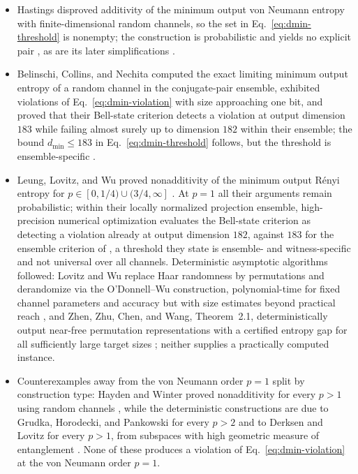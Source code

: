 \begin{itemize}
  \item Hastings disproved additivity of the minimum output von Neumann entropy with
finite-dimensional random channels, so the set in
Eq.~\eqref{eq:dmin-threshold} is nonempty; the construction is probabilistic
and yields no explicit pair , as are its
later simplifications .

  \item Belinschi, Collins, and Nechita computed the exact limiting minimum output
entropy of a random channel in the conjugate-pair ensemble, exhibited
violations of Eq.~\eqref{eq:dmin-violation} with size approaching one bit,
and proved that their Bell-state criterion detects a violation at output
dimension $183$ while failing almost surely up to dimension $182$ within
their ensemble; the bound $d_{\min}\leq183$ in Eq.~\eqref{eq:dmin-threshold}
follows, but the threshold is ensemble-specific .

  \item Leung, Lovitz, and Wu proved nonadditivity of the minimum output R\'enyi
entropy for $p\in[0,1/4)\cup(3/4,\infty]$
.  At $p=1$ all their arguments remain
probabilistic; within their locally normalized projection ensemble,
high-precision numerical optimization evaluates the Bell-state criterion as
detecting a violation already at output dimension $182$, against $183$ for
the ensemble criterion of , a
threshold they state is ensemble- and witness-specific and not universal
over all channels.  Deterministic asymptotic algorithms followed: Lovitz
and Wu replace Haar randomness by permutations and derandomize via the
O'Donnell--Wu construction, polynomial-time for fixed channel parameters
and accuracy but with size estimates beyond practical reach
, and Zhen, Zhu, Chen, and Wang,
Theorem~2.1, deterministically output near-free permutation representations
with a certified entropy gap for all sufficiently large target sizes
; neither supplies a practically computed
instance.

  \item Counterexamples away from the von Neumann order $p=1$ split by construction
type: Hayden and Winter proved nonadditivity for every $p>1$ using random
channels , while the deterministic
constructions are due to Grudka, Horodecki, and Pankowski for every $p>2$
 and to Derksen and Lovitz for every
$p>1$, from subspaces with high geometric measure of entanglement
.  None of these produces a
violation of Eq.~\eqref{eq:dmin-violation} at the von Neumann order $p=1$.


\end{itemize}
